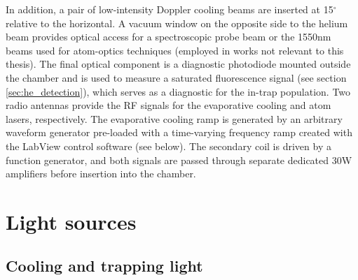 
	In addition, a pair of low-intensity Doppler cooling beams are inserted at 15$^\circ$ relative to the horizontal.
	A vacuum window on the opposite side to the helium beam provides optical access for a spectroscopic probe beam or the 1550nm beams used for atom-optics techniques (employed in works not relevant to this thesis).
	The final optical component is a diagnostic photodiode mounted outside the chamber and is used to measure a saturated fluorescence signal (see section \ref{sec:he_detection}), which serves as a diagnostic for the in-trap population.
	Two radio antennas provide the RF signals for the evaporative cooling and atom lasers, respectively.
	The evaporative cooling ramp is generated by an arbitrary waveform generator pre-loaded with a time-varying frequency ramp created with the LabView control software (see below).
	The secondary coil is driven by a function generator, and both signals are passed through separate dedicated 30W amplifiers before insertion into the chamber.


\section{Light sources}\label{ssec:lasers}
\subsection{Cooling and trapping light}
	

